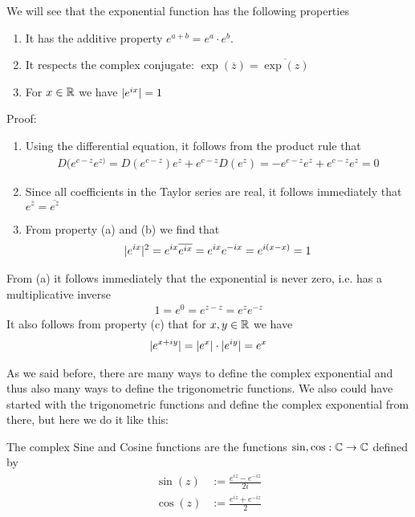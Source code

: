 We will see that the exponential function has the following properties

\begin{enumerate}
\item 	It has the additive property $e^{a+b} = e^{a} \cdot e^{b}$.
\item 	It respects the complex conjugate: $\exp(\overline{z}) = \overline{\exp(z)}$
\item 	For $x \in \mathbb{R}$ we have $\vert e^{ix}\vert = 1$
\end{enumerate}

Proof:
\begin{enumerate}
\item Using the differential equation, it follows from the product rule that
	\begin{align*}
		D(e^{c-z}e^{z)} = D(e^{c-z}) e^{z} + e^{c-z}D(e^{z}) = -e^{c-z}e^{z} + e^{c-z}e^{z} = 0
	\end{align*}
\item Since all coefficients in the Taylor series are real, it follows immediately that $e^{\overline{z}} = \overline{e^{z}}$
\item From property (a) and (b) we find that
	\begin{align*}
		\vert e^{ix}\vert^2 = e^{ix} \overline{e^{ix}} = e^{ix} e^{-ix} = e^{i(x-x)} = 1
	\end{align*}
\end{enumerate}

From (a) it follows immediately that the exponential is never zero, i.e. has a multiplicative inverse
\begin{align*}
	1 = e^{0} = e^{z-z} = e^{z}e^{-z}
\end{align*}
It also follows from property (c) that for $x,y \in \mathbb{R}$ we have
\begin{align*}
	\vert e^{x + iy}\vert = \vert e^{x}\vert \cdot \vert e^{iy}\vert = e^{x} 
\end{align*}

As we said before, there are many ways to define the complex exponential and thus also many ways to define the trigonometric functions. We also could have started with the trigonometric functions and define the complex exponential from there, but here we do it like this:
\begin{definition}
	The complex Sine and Cosine functions are the functions $\sin, \cos: \mathbb{C} \to \mathbb{C}$ defined by
	\begin{align*}
		\sin(z) &:= \frac{e^{iz} - e^{-iz}}{2i}\\
		\cos(z) &:= \frac{e^{iz} + e^{-iz}}{2}
	\end{align*}
\end{definition}

